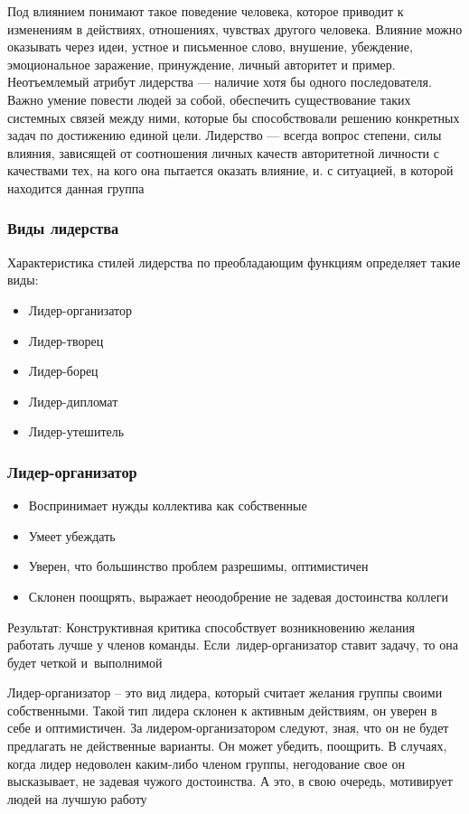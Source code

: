 \documentclass{../industrial-development}
\begin{document}
\lecturenotes Под влиянием понимают такое поведение человека, которое приводит к изменениям в действиях, отношениях, чувствах другого человека. Влияние можно оказывать через идеи, устное и письменное слово, внушение, убеждение, эмоциональное заражение, принуждение, личный авторитет и пример.
Неотъемлемый атрибут лидерства — наличие хотя бы одного последователя. Важно умение повести людей за собой, обеспечить существование таких системных связей между ними, которые бы способствовали решению конкретных задач по достижению единой цели.
Лидерство — всегда вопрос степени, силы влияния, зависящей от соотношения личных качеств авторитетной личности с качествами тех, на кого она пытается оказать влияние, и. с ситуацией, в которой находится данная группа

\begin{frame} \frametitle{Виды лидерства}
Характеристика стилей лидерства по преобладающим функциям определяет такие виды: 
  \begin{itemize}
  \item Лидер-организатор 
  \item Лидер-творец
  \item Лидер-борец  
  \item Лидер-дипломат
  \item Лидер-утешитель
  \end{itemize}
\end{frame}

\begin{frame} \frametitle{Лидер-организатор}

\begin{itemize}
  \item Воспринимает нужды коллектива как собственные 
  \item Умеет убеждать
  \item Уверен, что большинство проблем разрешимы, оптимистичен
  \item Склонен поощрять, выражает неоодобрение не задевая достоинства коллеги
  \end{itemize}

\begin{block}{Результат:}
Конструктивная критика способствует возникновению желания работать лучше у членов команды. Если~лидер-организатор ставит задачу, то она будет четкой и~выполнимой
\end{block}
\end{frame}
\lecturenotes Лидер-организатор – это вид лидера, который считает желания группы своими собственными. Такой тип лидера склонен к активным действиям, он уверен в себе и оптимистичен. За лидером-организатором следуют, зная, что он не будет предлагать не действенные варианты. Он может убедить, поощрить. В случаях, когда лидер недоволен каким-либо членом группы, негодование свое он высказывает, не задевая чужого достоинства. А это, в свою очередь, мотивирует людей на лучшую работу
\end{document}
